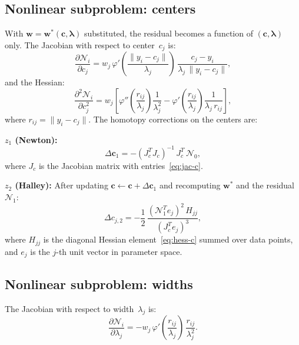 \documentclass[11pt,a4paper]{article}
\begin{document}
\subsection{Nonlinear subproblem: centers}

With $\mathbf{w} = \mathbf{w}^*(\mathbf{c}, \boldsymbol{\lambda})$ substituted, the residual becomes a function of $(\mathbf{c}, \boldsymbol{\lambda})$ only. The Jacobian with respect to center~$c_j$ is:
\begin{equation}
\frac{\partial\mathcal{N}_i}{\partial c_j} = w_j\,\varphi'\!\left(\frac{\|y_i - c_j\|}{\lambda_j}\right)\,\frac{c_j - y_i}{\lambda_j\,\|y_i - c_j\|},
\label{eq:jac-c}
\end{equation}
and the Hessian:
\begin{equation}
\frac{\partial^2\mathcal{N}_i}{\partial c_j^2} = w_j\left[\varphi''\!\left(\frac{r_{ij}}{\lambda_j}\right)\frac{1}{\lambda_j^2} - \varphi'\!\left(\frac{r_{ij}}{\lambda_j}\right)\frac{1}{\lambda_j\,r_{ij}}\right],
\label{eq:hess-c}
\end{equation}
where $r_{ij} = \|y_i - c_j\|$. The homotopy corrections on the centers are:

\textbf{$z_1$ (Newton):}
\begin{equation}
\Delta\mathbf{c}_1 = -(J_c^T J_c)^{-1}\,J_c^T\,\mathcal{N}_0,
\label{eq:z1-c}
\end{equation}
where $J_c$ is the Jacobian matrix with entries~\eqref{eq:jac-c}.

\textbf{$z_2$ (Halley):} After updating $\mathbf{c} \leftarrow \mathbf{c} + \Delta\mathbf{c}_1$ and recomputing $\mathbf{w}^*$ and the residual~$\mathcal{N}_1$:
\begin{equation}
\Delta c_{j,2} = -\frac{1}{2}\,\frac{(\mathcal{N}_1^T e_j)^2\,H_{jj}}{(J_c^T e_j)^3},
\label{eq:z2-c}
\end{equation}
where $H_{jj}$ is the diagonal Hessian element~\eqref{eq:hess-c} summed over data points, and $e_j$ is the $j$-th unit vector in parameter space.

\subsection{Nonlinear subproblem: widths}

The Jacobian with respect to width~$\lambda_j$ is:
\begin{equation}
\frac{\partial\mathcal{N}_i}{\partial\lambda_j} = -w_j\,\varphi'\!\left(\frac{r_{ij}}{\lambda_j}\right)\,\frac{r_{ij}}{\lambda_j^2}.
\label{eq:jac-lambda}
\end{equation}
\end{document}
